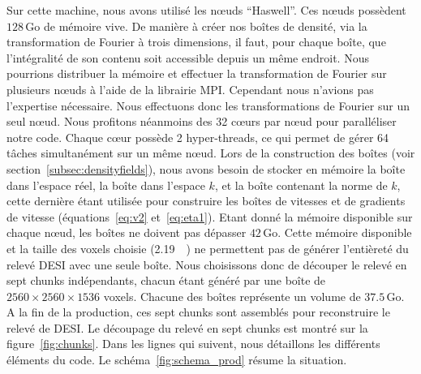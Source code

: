 Sur cette machine, nous avons utilisé les n{\oe}uds ``Haswell''.
Ces n{\oe}uds possèdent $\num{128}\,\mathrm{Go}$ de mémoire vive. De manière à créer nos boîtes de densité, via la transformation de Fourier à trois dimensions, il faut, pour chaque boîte, que l'intégralité de son contenu soit accessible depuis un même endroit.
Nous pourrions distribuer la mémoire et effectuer la transformation de Fourier sur plusieurs n{\oe}uds à l'aide de la librairie MPI.
Cependant nous n'avions pas l'expertise nécessaire. Nous effectuons donc les transformations de Fourier sur un seul n{\oe}ud.
Nous profitons néanmoins des \num{32} c{\oe}urs par n{\oe}ud pour paralléliser notre code. Chaque c{\oe}ur possède 2 hyper-threads, ce qui permet de gérer 64 tâches simultanément sur un même n{\oe}ud.
Lors de la construction des boîtes (voir section~\ref{subsec:densityfields}), nous avons besoin de stocker en mémoire la boîte dans l'espace réel, la boîte dans l'espace $k$, et la boîte contenant la norme de $k$, cette dernière étant utilisée pour construire les boîtes de vitesses et de gradients de vitesse (équations~\ref{eq:v2} et~\ref{eq:eta1}).
Etant donné la mémoire disponible sur chaque n{\oe}ud, les boîtes ne doivent pas dépasser $\num{42}\,\mathrm{Go}$. Cette mémoire disponible et la taille des voxels choisie (\SI{2.19}{\perh\Mpc}) ne permettent pas de générer l'entièreté du relevé DESI avec une seule boîte.
Nous choisissons donc de découper le relevé en sept chunks indépendants, chacun étant généré par une boîte de $\num{2560}\times\num{2560}\times\num{1536}$ voxels. Chacune des boîtes représente un volume de $\num{37.5}\,\mathrm{Go}$. A la fin de la production, ces sept chunks sont assemblés pour reconstruire le relevé de DESI. Le découpage du relevé en sept chunks est montré sur la figure~\ref{fig:chunks}.
Dans les lignes qui suivent, nous détaillons les différents éléments du code.
Le schéma~\ref{fig:schema_prod} résume la situation.
